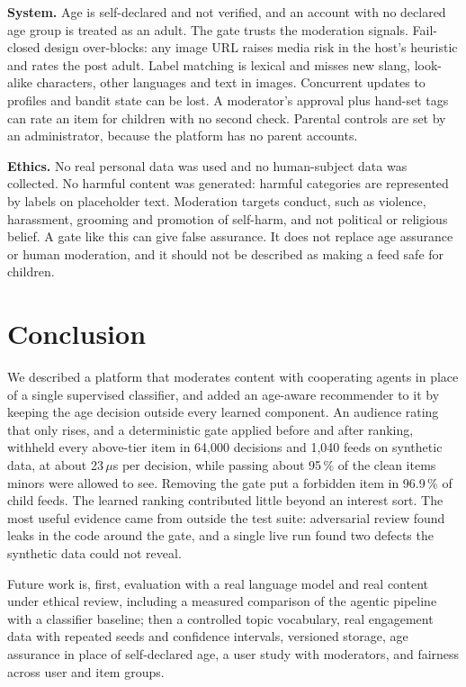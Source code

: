 \documentclass[conference]{IEEEtran}
\newcommand{\pct}{\,\%}
\begin{document}
\textbf{System.} Age is self-declared and not verified, and an account with no declared age group is treated as an adult. The gate trusts the moderation signals. Fail-closed design over-blocks: any image URL raises media risk in the host's heuristic and rates the post adult. Label matching is lexical and misses new slang, look-alike characters, other languages and text in images. Concurrent updates to profiles and bandit state can be lost. A moderator's approval plus hand-set tags can rate an item for children with no second check. Parental controls are set by an administrator, because the platform has no parent accounts.

\textbf{Ethics.} No real personal data was used and no human-subject data was collected. No harmful content was generated: harmful categories are represented by labels on placeholder text. Moderation targets conduct, such as violence, harassment, grooming and promotion of self-harm, and not political or religious belief. A gate like this can give false assurance. It does not replace age assurance or human moderation, and it should not be described as making a feed safe for children.

\section{Conclusion}

We described a platform that moderates content with cooperating agents in place of a single supervised classifier, and added an age-aware recommender to it by keeping the age decision outside every learned component. An audience rating that only rises, and a deterministic gate applied before and after ranking, withheld every above-tier item in 64,000 decisions and 1,040 feeds on synthetic data, at about 23\,$\mu$s per decision, while passing about 95\pct{} of the clean items minors were allowed to see. Removing the gate put a forbidden item in 96.9\pct{} of child feeds. The learned ranking contributed little beyond an interest sort. The most useful evidence came from outside the test suite: adversarial review found leaks in the code around the gate, and a single live run found two defects the synthetic data could not reveal.

Future work is, first, evaluation with a real language model and real content under ethical review, including a measured comparison of the agentic pipeline with a classifier baseline; then a controlled topic vocabulary, real engagement data with repeated seeds and confidence intervals, versioned storage, age assurance in place of self-declared age, a user study with moderators, and fairness across user and item groups.



\end{document}
